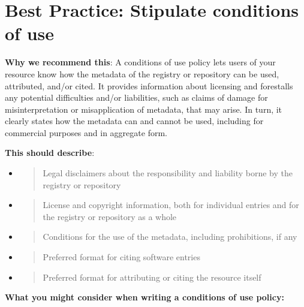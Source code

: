 \documentclass[]{article}
\begin{document}
\newpage
\section{Best Practice: Stipulate conditions of use
}\label{best-practice-stipulate-conditions-of-use}

\textbf{Why we recommend this}: A conditions of use policy lets users of
your resource know how the metadata of the registry or repository can be
used, attributed, and/or cited. It provides information about licensing
and forestalls any potential difficulties and/or liabilities, such as
claims of damage for misinterpretation or misapplication of metadata,
that may arise. In turn, it clearly states how the metadata can and
cannot be used, including for commercial purposes and in aggregate form.

\textbf{This should describe}:

\begin{itemize}
\item
  \begin{quote}
  Legal disclaimers about the responsibility and liability borne by the
  registry or repository
  \end{quote}
\item
  \begin{quote}
  License and copyright information, both for individual entries and for
  the registry or repository as a whole
  \end{quote}
\item
  \begin{quote}
  Conditions for the use of the metadata, including prohibitions, if any
  \end{quote}
\item
  \begin{quote}
  Preferred format for citing software entries
  \end{quote}
\item
  \begin{quote}
  Preferred format for attributing or citing the resource itself
  \end{quote}
\end{itemize}

\textbf{What you might consider when writing a conditions of use
policy:}
\end{document}
